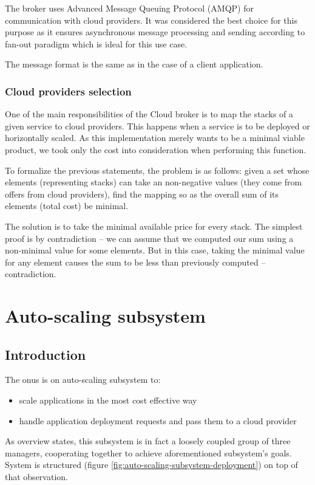 The broker uses Advanced Message Queuing Protocol (AMQP) for communication with cloud providers. It was considered the best choice for this purpose as it ensures asynchronous message processing and sending according to fan-out paradigm which is ideal for this use case.

The message format is the same as in the case of a client application.

\subsubsection{Cloud providers selection}
One of the main responsibilities of the Cloud broker is to map the stacks of a given service to cloud providers. This happens when a service is to be deployed or horizontally scaled. As this implementation merely wants to be a minimal viable product, we took only the cost into consideration when performing this function.

To formalize the previous statements, the problem is as follows: given a set whose elements (representing stacks) can take an non-negative values (they come from offers from cloud providers), find the mapping so as the overall sum of its elements (total cost) be minimal.

The solution is to take the minimal available price for every stack. The simplest proof is by contradiction -- we can assume that we computed our sum using a non-minimal value for some elements. But in this case, taking the minimal value for any element causes the sum to be less than previously computed -- contradiction.

\section{Auto-scaling subsystem}

\subsection{Introduction}
The onus is on auto-scaling subsystem to:
\begin{itemize}
 \item scale applications in the most cost effective way
 \item handle application deployment requests and pass them to a cloud provider 
\end{itemize}

As overview states, this subsystem is in fact a loosely coupled group of three managers, cooperating together to achieve aforementioned subsystem's goals. System is structured (figure \ref{fig:auto-scaling-subsystem-deployment}) on top of that observation.

